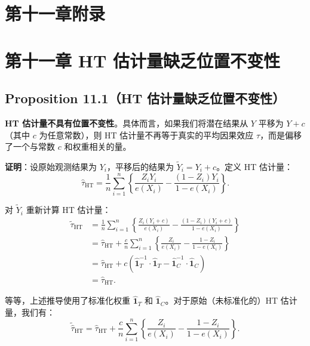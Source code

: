 
\section{第十一章附录}\label{sec:appendix-11-balancing-proof}\label{sec:appendix-11-dimension-reduction-proof}\label{sec:appendix-11-discretization}\label{sec:appendix-11-overlap}\label{sec:appendix-11-ht-expectation}\label{sec:appendix-11-ht-variance}\label{sec:appendix-11-ipw-normalized}\label{sec:appendix-11-ps-estimator}
\section{第十一章 HT 估计量缺乏位置不变性}\label{sec:appendix-11-ht-location}

\subsection*{Proposition 11.1（HT 估计量缺乏位置不变性）}
\label{prop:11-ht-location}
\textbf{HT 估计量不具有位置不变性}。具体而言，如果我们将潜在结果从 $Y$ 平移为 $Y + c$（其中 $c$ 为任意常数），则 HT 估计量不再等于真实的平均因果效应 $\tau$，而是偏移了一个与常数 $c$ 和权重相关的量。

\textbf{证明}：设原始观测结果为 $Y_i$，平移后的结果为 $\tilde Y_i = Y_i + c$。定义 HT 估计量：
\[
\hat\tau_{\text{HT}} = \frac{1}{n}\sum_{i=1}^n\left\{ \frac{Z_i Y_i}{e(X_i)} - \frac{(1-Z_i)Y_i}{1-e(X_i)} \right\}.
\]

对 $\tilde Y_i$ 重新计算 HT 估计量：
\[
\begin{aligned}
\tilde\tau_{\text{HT}}
&= \frac{1}{n}\sum_{i=1}^n\left\{ \frac{Z_i(Y_i + c)}{e(X_i)} - \frac{(1-Z_i)(Y_i + c)}{1-e(X_i)} \right\} \\
&= \hat\tau_{\text{HT}} + \frac{c}{n}\sum_{i=1}^n\left\{ \frac{Z_i}{e(X_i)} - \frac{1-Z_i}{1-e(X_i)} \right\} \\
&= \hat\tau_{\text{HT}} + c\left(\hat{\mathbf{1}}_T^{-1} \cdot \hat{\mathbf{1}}_T - \hat{\mathbf{1}}_C^{-1} \cdot \hat{\mathbf{1}}_C \right) \\
&= \hat\tau_{\text{HT}}.
\end{aligned}
\]

等等，上述推导使用了标准化权重 $\hat{\mathbf{1}}_T$ 和 $\hat{\mathbf{1}}_C$。对于原始（未标准化的）HT 估计量，我们有：
\[
\tilde{\hat\tau}_{\text{HT}}
= \hat\tau_{\text{HT}} + \frac{c}{n}\sum_{i=1}^n\left\{ \frac{Z_i}{e(X_i)} - \frac{1-Z_i}{1-e(X_i)} \right\}.
\]

